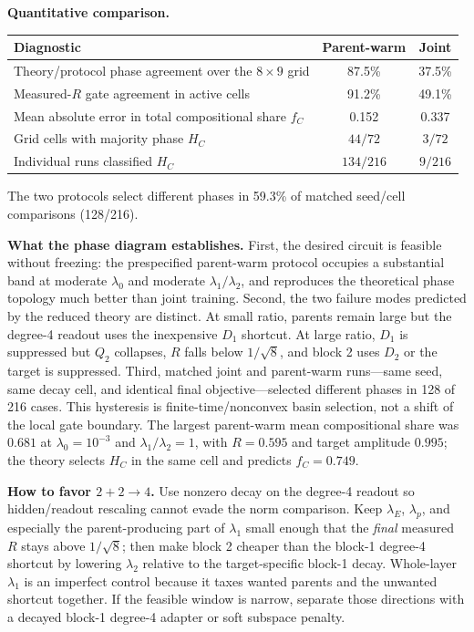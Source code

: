 \documentclass[10pt]{article}
\newcommand{\WarmPhaseAgreement}{87.5\%}
\newcommand{\JointPhaseAgreement}{37.5\%}
\newcommand{\WarmGateAgreement}{91.2\%}
\newcommand{\JointGateAgreement}{49.1\%}
\newcommand{\WarmShareMAE}{0.152}
\newcommand{\JointShareMAE}{0.337}
\newcommand{\ProtocolDisagreement}{59.3\%}
\begin{document}
\clearpage
\textbf{Quantitative comparison.}

\begin{center}
\begin{tabular}{@{}lcc@{}}
\toprule
Diagnostic & Parent-warm & Joint \\
\midrule
Theory/protocol phase agreement over the $8\times9$ grid
  & \WarmPhaseAgreement & \JointPhaseAgreement \\
Measured-$R$ gate agreement in active cells
  & \WarmGateAgreement & \JointGateAgreement \\
Mean absolute error in total compositional share $f_C$
  & \WarmShareMAE & \JointShareMAE \\
Grid cells with majority phase $H_C$ & $44/72$ & $3/72$ \\
Individual runs classified $H_C$ & $134/216$ & $9/216$ \\
\bottomrule
\end{tabular}
\end{center}

The two protocols select different phases in \ProtocolDisagreement{} of matched
seed/cell comparisons (128/216).

\textbf{What the phase diagram establishes.}
First, the desired circuit is feasible without freezing: the prespecified parent-warm
protocol occupies a substantial band at moderate $\lambda_0$ and moderate
$\lambda_1/\lambda_2$, and reproduces the theoretical phase topology much better than joint
training.  Second, the two
failure modes predicted by the reduced theory are distinct.  At small ratio, parents remain
large but the degree-4 readout uses the inexpensive $D_1$ shortcut.  At large ratio, $D_1$
is suppressed but $Q_2$ collapses, $R$ falls below $1/\sqrt8$, and block 2 uses $D_2$ or the
target is suppressed.  Third, matched joint and parent-warm runs---same seed, same decay cell,
and identical final objective---selected different phases in 128 of 216 cases.  This
hysteresis is finite-time/nonconvex basin selection, not a shift of the local gate boundary.
The largest parent-warm mean compositional share was $0.681$ at $\lambda_0=10^{-3}$ and
$\lambda_1/\lambda_2=1$, with $R=0.595$ and target amplitude $0.995$; the theory selects
$H_C$ in the same cell and predicts $f_C=0.749$.

\textbf{How to favor $2+2\!\to\!4$.}
Use nonzero decay on the degree-4 readout so hidden/readout rescaling cannot evade the norm
comparison.  Keep $\lambda_E$, $\lambda_p$, and especially the parent-producing part of
$\lambda_1$ small enough that the \emph{final} measured $R$ stays above $1/\sqrt8$; then make
block 2 cheaper than the block-1 degree-4 shortcut by lowering $\lambda_2$ relative to the
target-specific block-1 decay.  Whole-layer $\lambda_1$ is an imperfect control because it
taxes wanted parents and the unwanted shortcut together.  If the feasible window is narrow,
separate those directions with a decayed block-1 degree-4 adapter or soft subspace penalty.
\end{document}
